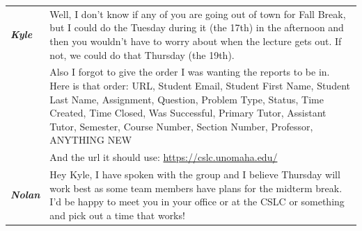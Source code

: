 \documentclass[oneside,openany,obeyspaces]{book}
\begin{document}
\begin{flushleft}
\begin{center}
\begin{longtable}{ p{1.5cm} p{13.5cm} }
            \textbf{\textit{Kyle}}  & Well, I don't know if any of you are going out of town for Fall Break, but I could do the Tuesday during it (the 17th) in the afternoon and then you wouldn't have to worry about when the lecture gets out. If not, we could do that Thursday (the 19th).                                                                                                                                                                                                                                                                                                                                                                                                                              \\
                                    & Also I forgot to give the order I was wanting the reports to be in. Here is that order: URL, Student Email, Student First Name, Student Last Name, Assignment, Question, Problem Type, Status, Time Created, Time Closed, Was Successful, Primary Tutor, Assistant Tutor, Semester, Course Number, Section Number, Professor, ANYTHING NEW                                                                                                                                                                                                                                                                                                                                              \\
                                    & And the url it should use: \url{https://cslc.unomaha.edu/}                                                                                                                                                                                                                                                                                                                                                                                                                                                                                                                                                                                                                              \\

            \textbf{\textit{Nolan}} & Hey Kyle, I have spoken with the group and I believe Thursday will work best as some team members have plans for the midterm break. I'd be happy to meet you in your office or at the CSLC or something and pick out a time that works!                                                                                                                                                                                                                                                                                                                                                                                                                                                 \\


\end{longtable}
\end{center}
\end{flushleft}
\end{document}

